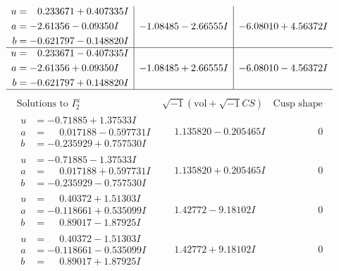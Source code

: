 \documentclass[1p]{elsarticle_modified}
\theoremstyle{definition}
\newcommand{\I}{\sqrt{-1}}
\begin{document}
$$\begin{array}{c|c|c}
\begin{aligned}
u &= \phantom{-}0.233671 + 0.407335 I \\
a &= -2.61356 - 0.09350 I \\
b &= -0.621797 - 0.148820 I\end{aligned}
 & -1.08485 - 2.66555 I & -6.08010 + 4.56372 I \\ \hline\begin{aligned}
u &= \phantom{-}0.233671 - 0.407335 I \\
a &= -2.61356 + 0.09350 I \\
b &= -0.621797 + 0.148820 I\end{aligned}
 & -1.08485 + 2.66555 I & -6.08010 - 4.56372 I\\
 \hline 
 \end{array}$$\newpage$$\begin{array}{c|c|c}  
\text{Solutions to }I^u_{2}& \I (\text{vol} + \sqrt{-1}CS) & \text{Cusp shape}\\
 \hline 
\begin{aligned}
u &= -0.71885 + 1.37533 I \\
a &= \phantom{-}0.017188 - 0.597731 I \\
b &= -0.235929 + 0.757530 I\end{aligned}
 & \phantom{-}1.135820 - 0.205465 I & \phantom{-0.000000 } 0 \\ \hline\begin{aligned}
u &= -0.71885 - 1.37533 I \\
a &= \phantom{-}0.017188 + 0.597731 I \\
b &= -0.235929 - 0.757530 I\end{aligned}
 & \phantom{-}1.135820 + 0.205465 I & \phantom{-0.000000 } 0 \\ \hline\begin{aligned}
u &= \phantom{-}0.40372 + 1.51303 I \\
a &= -0.118661 + 0.535099 I \\
b &= \phantom{-}0.89017 - 1.87925 I\end{aligned}
 & \phantom{-}1.42772 - 9.18102 I & \phantom{-0.000000 } 0 \\ \hline\begin{aligned}
u &= \phantom{-}0.40372 - 1.51303 I \\
a &= -0.118661 - 0.535099 I \\
b &= \phantom{-}0.89017 + 1.87925 I\end{aligned}
 & \phantom{-}1.42772 + 9.18102 I & \phantom{-0.000000 } 0 \\ \hline\begin{aligned}

\end{aligned}
\end{array}$$
\end{document}
